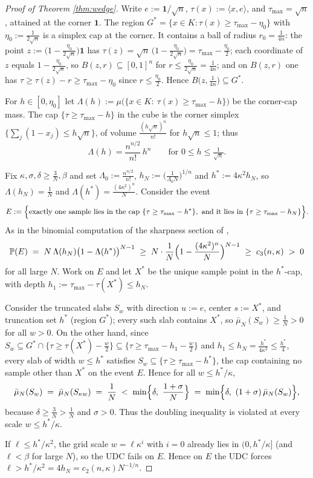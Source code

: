 ﻿\documentclass[11pt]{article}
\newcommand{\PP}{\mathbb{P}}
\newcommand{\emp}{\bar\mu_N}
\begin{document}
\begin{proof}[Proof of Theorem \ref{thm:wedge}]
Write $e:=\mathbf 1/\sqrt n$, $\tau(x):=\langle x,e\rangle$, and
$\tau_{\max}=\sqrt n$, attained at the corner $\mathbf 1$.  The region
$G^*=\{x\in K:\tau(x)\ge\tau_{\max}-\eta_0\}$ with
$\eta_0:=\frac{1}{2\sqrt n}$ is a simplex cap at the corner.  It contains a
ball of radius $r_0=\frac1{4n}$: the point
$z:=\bigl(1-\tfrac{\eta_0}{2\sqrt n}\bigr)\mathbf 1$ has
$\tau(z)=\sqrt n\,\bigl(1-\tfrac{\eta_0}{2\sqrt n}\bigr)
=\tau_{\max}-\tfrac{\eta_0}{2}$; each coordinate of $z$ equals
$1-\tfrac{\eta_0}{2\sqrt n}$, so $B(z,r)\subseteq[0,1]^n$ for
$r\le\tfrac{\eta_0}{2\sqrt n}=\tfrac1{4n}$; and on $B(z,r)$ one has
$\tau\ge\tau(z)-r\ge\tau_{\max}-\eta_0$ since $r\le\tfrac{\eta_0}2$.  Hence
$B\bigl(z,\tfrac1{4n}\bigr)\subseteq G^*$.

For $h\in[0,\eta_0]$ let
$\Lambda(h):=\mu\bigl(\{x\in K:\ \tau(x)\ge\tau_{\max}-h\}\bigr)$ be the
corner-cap mass.  The cap $\{\tau\ge\tau_{\max}-h\}$ in the cube is the corner
simplex $\{\sum_j(1-x_j)\le h\sqrt n\}$, of volume
$\frac{(h\sqrt n)^n}{n!}$ for $h\sqrt n\le1$; thus
\begin{equation}\label{eq:cap}
\Lambda(h)=\frac{n^{n/2}}{n!}\,h^{n}
\qquad\text{for }0\le h\le\tfrac1{\sqrt n}.
\end{equation}

Fix $\kappa,\sigma,\delta\ge\frac3N,\beta$ and set
$\Lambda_0:=\frac{n^{n/2}}{n!}$, $h_N:=\bigl(\frac{1}{\Lambda_0N}\bigr)^{1/n}$
and $h^*:=4\kappa^2h_N$, so $\Lambda(h_N)=\frac1N$ and
$\Lambda(h^*)=\frac{(4\kappa^2)^n}{N}$.  Consider the event
\[
E:=\Bigl\{\text{exactly one sample lies in the cap }
\{\tau\ge\tau_{\max}-h^*\},\ \text{and it lies in }
\{\tau\ge\tau_{\max}-h_N\}\Bigr\}.
\]
As in the binomial computation of the sharpness section of \cite{companion2},
\[
\PP(E)\;=\;N\,\Lambda(h_N)\bigl(1-\Lambda(h^*)\bigr)^{N-1}
\;\ge\;N\cdot\frac1N\Bigl(1-\frac{(4\kappa^2)^n}{N}\Bigr)^{N-1}
\;\ge\;c_3(n,\kappa)\;>\;0
\]
for all large $N$.  Work on $E$ and let $X^*$ be the unique sample point in
the $h^*$-cap, with depth $h_1:=\tau_{\max}-\tau(X^*)\le h_N$.

Consider the truncated slabs $S_w$ with direction $u:=e$, center $s:=X^*$, and
truncation set $h^*$ (region $G^*$); every such slab contains $X^*$, so
$\emp(S_w)\ge\frac1N>0$ for all $w>0$.  On the other hand, since $S_w\subseteq
G^*\cap\{\tau\ge\tau(X^*)-\frac w2\}\subseteq\{\tau\ge\tau_{\max}-h_1-\frac
w2\}$ and $h_1\le h_N=\frac{h^*}{4\kappa^2}\le\frac{h^*}4$, every slab of
width $w\le h^*$ satisfies
$S_w\subseteq\{\tau\ge\tau_{\max}-h^*\}$, the cap containing no sample other
than $X^*$ on the event $E$.  Hence for all $w\le h^*/\kappa$,
\[
\emp(S_w)\;=\;\emp(S_{\kappa w})\;=\;\frac1N
\;<\;\min\Bigl\{\delta,\ \frac{1+\sigma}{N}\Bigr\}
\;=\;\min\Bigl\{\delta,\ (1+\sigma)\,\emp(S_w)\Bigr\},
\]
because $\delta\ge\frac3N>\frac1N$ and $\sigma>0$.  Thus the doubling
inequality is violated at every scale $w\le h^*/\kappa$.

If $\ell\le h^*/\kappa^2$, the grid scale $w=\ell\kappa^{i}$ with $i=0$
already lies in $(0,h^*/\kappa]$ (and $\ell<\beta$ for large $N$), so the UDC
fails on $E$.  Hence on $E$ the UDC forces
$\ell>h^*/\kappa^2=4h_N=c_2(n,\kappa)N^{-1/n}$.
\end{proof}
\end{document}
